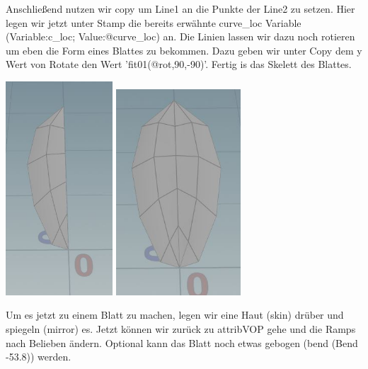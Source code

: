 \documentclass[paper=a4,fontsize=12pt,ngerman]{scrartcl}
\begin{document}
	\begin{minipage}{0.7\textwidth}
		Anschließend nutzen wir copy um Line1 an die Punkte der Line2 zu setzen. Hier legen wir jetzt unter Stamp die bereits erwähnte curve\_loc Variable (Variable:c\_loc; Value:@curve\_loc) an. Die Linien lassen wir dazu noch rotieren um eben die Form eines Blattes zu bekommen. Dazu geben wir unter Copy dem y Wert von Rotate den Wert 'fit01(@rot,90,-90)'. Fertig is das Skelett des Blattes.
	\end{minipage}

	\begin{minipage}{0.5\textwidth}
	\includegraphics[width=0.3\textwidth]{graphics/blossom2.JPG}
	\includegraphics[width=0.35\textwidth]{graphics/blossom3.JPG}
	\end{minipage}
	\begin{minipage}{0.5\textwidth}
		Um es jetzt zu einem Blatt zu machen, legen wir eine Haut (skin) drüber und spiegeln (mirror) es. Jetzt können wir zurück zu attribVOP gehe und die Ramps nach Belieben ändern. Optional kann das Blatt noch etwas gebogen (bend (Bend -53.8)) werden.
	\end{minipage}
	
\end{document}
